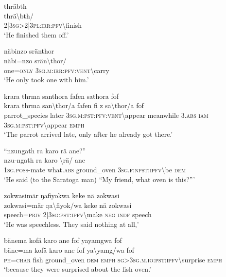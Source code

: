 \ea\label{ex:3:a7569}
thräbth\\
\gll thrä{\textbackslash}bth/\\
     2|3\textsc{sg}>2|3\textsc{pl}:\textsc{irr}:\textsc{pfv}{\textbackslash}finish\\
\glt `He finished them off.'
\z

\ea\label{ex:3:a7570}
näbinzo sränthor\\
\gll näbi=nzo	srän{\textbackslash}thor/\\
     one=\textsc{only}	3\textsc{sg}.\textsc{m}:\textsc{irr}:\textsc{pfv}:\textsc{vent}{\textbackslash}carry\\
\glt `He only took one with him.'
\z

\ea\label{ex:3:a7571}
krara thrma santhora fafen sathora fof\\
\gll krara	thrma	san{\textbackslash}thor/a	fafen	fi	z	sa{\textbackslash}thor/a	fof\\
     parrot\_species	later	3\textsc{sg}.\textsc{m}:\textsc{pst}:\textsc{pfv}:\textsc{vent}{\textbackslash}appear	meanwhile	3.\textsc{abs}	\textsc{iam}	3\textsc{sg}.\textsc{m}:\textsc{pst}:\textsc{pfv}{\textbackslash}appear	\textsc{emph}\\
\glt `The parrot arrived late, only after he already got there.'
\z

\ea\label{ex:3:a7573}
``nzungath ra karo rä ane?''\\
\gll nzu-ngath	ra	karo	{\textbackslash}rä/	ane\\
     1\textsc{sg}.\textsc{poss}-mate	what.\textsc{abs}	ground\_oven	3\textsc{sg}.\textsc{f}:\textsc{npst}:\textsc{ipfv}{\textbackslash}be	\textsc{dem}\\
\glt `He said (to the Saratoga man) ``My friend, what oven is this?'''
\z

\ea\label{ex:3:a7574}
zokwasimär ŋafiyokwa keke nä zokwasi\\
\gll zokwasi=mär	ŋa{\textbackslash}fiyok/wa	keke	nä	zokwasi\\
     speech=\textsc{priv}	2|3\textsc{sg}:\textsc{pst}:\textsc{ipfv}{\textbackslash}make	\textsc{neg}	\textsc{indf}	speech\\
\glt `He was speechless. They said nothing at all,'
\z

\ea\label{ex:3:a7576}
bänema kofä karo ane fof yayamgwa fof\\
\gll bäne=ma	kofä	karo	ane	fof	ya{\textbackslash}yamg/wa	fof\\
     \textsc{ph}=\textsc{char}	fish	ground\_oven	\textsc{dem}	\textsc{emph}	\textsc{sg}>3\textsc{sg}.\textsc{m}.\textsc{io}:\textsc{pst}:\textsc{ipfv}{\textbackslash}surprise	\textsc{emph}\\
\glt `because they were surprised about the fish oven.'
\z


